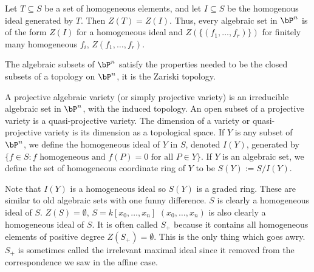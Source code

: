 \begin{prop}
Let $T \subseteq S$ be a set of homogeneous elements, and let $I \subseteq S$ be the homogenous ideal generated by $T$. Then $Z(T)= Z(I)$. Thus, every algebraic set in $\bP^n$ is of the form $Z(I)$ for a homogeneous ideal and $Z(\{(f_1,\ldots,f_r)\})$ for finitely many homogeneous $f_i$, $Z(f_1,\ldots,f_r)$. 
\end{prop}


The algebraic subsets of $\bP^n$ satisfy the properties needed to be the closed subsets of a topology on $\bP^n$, it is the Zariski topology. 


\begin{dfn}
A projective algebraic variety (or simply projective variety) is an irreducible algebraic set in $\bP^n$, with the induced topology. An open subset of a projective variety is a quasi-projective variety. The dimension of a variety or quasi-projective variety is its dimension as a topological space. If $Y$ is any subset of $\bP^n$, we define the homogeneous ideal of $Y$ in $S$, denoted $I(Y)$, generated by $\{ f \in S \colon f \text{ homogeneous and } f(P)=0 \text{ for all }P \in Y\}$. If $Y$ is an algebraic set, we define the set of homogeneous coordinate ring of $Y$ to be $S(Y):= S/I(Y)$.
\end{dfn}


Note that $I(Y)$ is a homogeneous ideal so $S(Y)$ is a graded ring. These are similar to old algebraic sets with one funny difference. $S$ is clearly a homogeneous ideal of $S$. $Z(S)= \emptyset$, $S= k[x_0,\ldots,x_n]$ $(x_0,\ldots,x_n)$ is also clearly a homogeneous ideal of $S$. It is often called $S_+$ because it contains all homogeneous elements of positive degree $Z(S_+)= \emptyset$. This is the only thing which goes awry. $S_+$ is sometimes called the irrelevant maximal ideal since it removed from the correspondence we saw in the affine case. 


